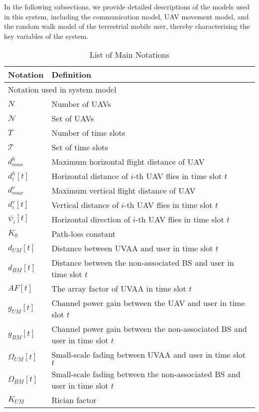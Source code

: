 \documentclass[10pt,journal,compsoc]{IEEEtran}
\begin{document}
\par In the following subsections, we provide detailed descriptions of the models used in this system, including the communication model, UAV movement model, and the random walk model of the terrestrial mobile user, thereby characterizing the key variables of the system. 

\begin{table}[]
\caption{List of Main Notations}
\label{tab:notation}
\begin{tabular}{@{} p{1.2cm} p{7.2cm} @{}}
\toprule
\textbf{Notation}             & \textbf{Definition}                 \\ \midrule
\multicolumn{2}{l}{Notation used in system model} \\
\hline
$N$ & Number of UAVs \\
$\mathcal{N}$ & Set of UAVs \\
$T$ & Number of time slots \\
$\mathcal{T}$ & Set of time slots\\
$d^h_{max}$ & Maximum horizontal flight distance of UAV \\
$d^h_i[t]$ & Horizontal distance of $i$-th UAV flies in time slot $t$ \\
$d^v_{max}$ & Maximum vertical flight distance of UAV \\
$d^v_i[t]$ & Vertical distance of $i$-th UAV flies in time slot $t$ \\
$\psi_i[t]$ & Horizontal direction of $i$-th UAV flies in time slot $t$ \\ 
$K_0$ & Path-loss constant \\
$d_{UM}[t]$ & Distance between UVAA and user in time slot $t$ \\
$d_{BM}[t]$ & Distance between the non-associated BS and user in time slot $t$ \\
$AF[t]$ & The array factor of UVAA in time slot $t$ \\
$g_{UM}[t]$ & Channel power gain between the UAV and user in time slot $t$ \\
$g_{BM}[t]$ & Channel power gain between the non-associated BS and user in time slot $t$ \\
$\Omega_{UM}[t]$ & Small-scale fading between UVAA and user in time slot $t$ \\
$\Omega_{BM}[t]$ & Small-scale fading between the non-associated BS and user in time slot $t$ \\
$K_{UM}$ & Rician factor \\

\end{tabular}
\end{table}
\end{document}

